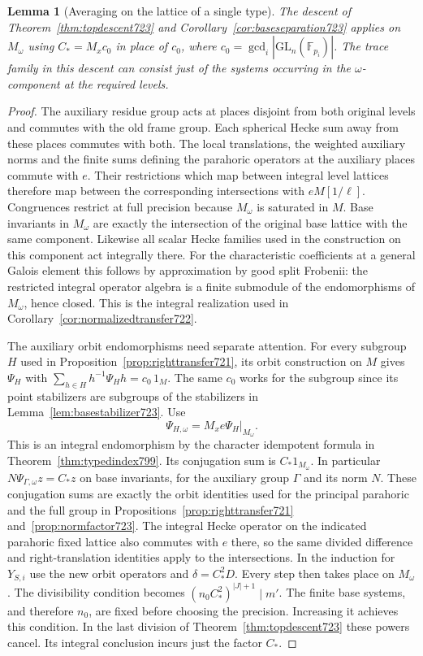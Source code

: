 \documentclass[a4paper,11pt]{article}
\newtheorem{lemma}[proposition]{Lemma}
\theoremstyle{definition}
\theoremstyle{remark}
\numberwithin{equation}{section}
\begin{document}
\begin{lemma}[Averaging on the lattice of a single type]
\leavevmode\label{lem:compressednorm802}
The descent of Theorem~\ref{thm:topdescent723} and
Corollary~\ref{cor:baseseparation723} applies on \(M_\omega\)
using \(C_*=M_xc_0\) in place of \(c_0\), where
\(c_0=\gcd_i|\mathrm{GL}_n(\mathbb F_{p_i})|\).
The trace family in this descent can consist just of the systems
occurring in the \(\omega\)-component at the required levels.
\end{lemma}
\begin{proof}
The auxiliary residue group acts at places disjoint from both
original levels and commutes with the old frame group. Each
spherical Hecke sum away from these places commutes with both.
The local translations, the weighted auxiliary norms and the
finite sums defining the parahoric operators at the auxiliary
places commute with \(e\). Their restrictions which map between
integral level lattices therefore map between the corresponding
intersections with \(eM[1/\ell]\). Congruences restrict at full
precision because \(M_\omega\) is saturated in \(M\).
Base invariants in \(M_\omega\) are exactly the intersection of
the original base lattice with the same component. Likewise all
scalar Hecke families used in the construction on this component
act integrally there. For the characteristic coefficients at a
general Galois element this follows by approximation by good
split Frobenii: the restricted integral operator algebra is a
finite submodule of the endomorphisms of \(M_\omega\), hence
closed. This is the integral realization used in
Corollary~\ref{cor:normalizedtransfer722}.

The auxiliary orbit endomorphisms need separate attention. For
every subgroup \(H\) used in Proposition~\ref{prop:righttransfer721},
its orbit construction on \(M\) gives \(\Psi_H\) with
\(\sum_{h\in H}h^{-1}\Psi_Hh=c_0\,1_M\). The same \(c_0\)
works for the subgroup since its point stabilizers are subgroups
of the stabilizers in Lemma~\ref{lem:basestabilizer723}. Use
\[
          \Psi_{H,\omega}=M_xe\Psi_H|_{M_\omega}.
\]
This is an integral endomorphism by the character idempotent
formula in Theorem~\ref{thm:typedindex799}. Its conjugation sum
is \(C_*1_{M_\omega}\). In particular
\(N\Psi_{\Gamma,\omega}z=C_*z\) on base invariants, for the
auxiliary group \(\Gamma\) and its norm \(N\).
These conjugation sums are exactly the orbit identities used for
the principal parahoric and the full group in
Propositions~\ref{prop:righttransfer721} and~\ref{prop:normfactor723}.
The integral Hecke operator on the indicated parahoric fixed
lattice also commutes with \(e\) there, so the same divided
difference and right-translation identities apply to the
intersections. In the induction for \(Y_{S,i}\) use the new
orbit operators and \(\delta=C_*^2D\). Every step then takes
place on \(M_\omega\). The divisibility condition becomes
\((n_0C_*^2)^{|J|+1}\mid m'\). The finite base systems, and
therefore \(n_0\), are fixed before choosing the precision.
Increasing it achieves this condition. In the last division
of Theorem~\ref{thm:topdescent723} these powers cancel. Its
integral conclusion incurs just the factor \(C_*\).
\end{proof}
\end{document}
